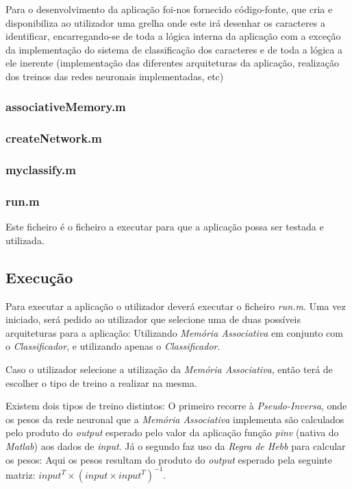 \documentclass{article}
\begin{document}
Para o desenvolvimento da aplicação foi-nos fornecido código-fonte, que cria e disponibiliza ao utilizador uma grelha onde este irá desenhar os caracteres a identificar, encarregando-se de toda a lógica interna da aplicação com a exceção da implementação do sistema de classificação dos caracteres e de toda a lógica a ele inerente (implementação das diferentes arquiteturas da aplicação, realização dos treinos das redes neuronais implementadas, etc)

\subsubsection{associativeMemory.m}


\subsubsection{createNetwork.m}


\subsubsection{myclassify.m}


\subsubsection{run.m}

Este ficheiro é o ficheiro a executar para que a aplicação possa ser testada e utilizada.

\subsection{Execução}

Para executar a aplicação o utilizador deverá executar o ficheiro \emph{run.m}. Uma vez iniciado, será pedido ao utilizador que selecione uma de duas possíveis arquiteturas para a aplicação: Utilizando \emph{Memória Associativa} em conjunto com o \emph{Classificador}, e utilizando apenas o \emph{Classificador}.

Caso o utilizador selecione a utilização da \emph{Memória Associativa}, então terá de escolher o tipo de treino a realizar na mesma.

Existem dois tipos de treino distintos: O primeiro recorre à \emph{Pseudo-Inversa}, onde os pesos da rede neuronal que a \emph{Memória Associativa} implementa são calculados pelo produto do \emph{output} esperado pelo valor da aplicação função \emph{pinv} (nativa do \emph{Matlab}) aos dados de \emph{input}. Já o segundo faz uso da \emph{Regra de Hebb} para calcular os pesos: Aqui os pesos resultam do produto do \emph{output} esperado pela seguinte matriz: $input^{T}\times \left(input\times input^{T}\right)^{-1}$.
\end{document}
